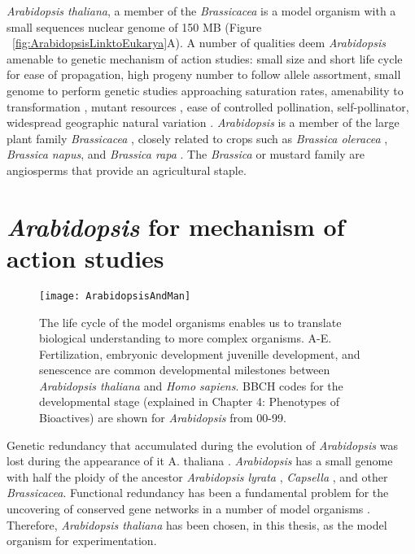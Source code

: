 {\it Arabidopsis thaliana}, a member of the {\it Brassicacea} is a model organism with a small sequences nuclear genome of 150 MB (Figure ~\ref{fig:ArabidopsisLinktoEukarya}A)\cite{mccourt2010arabidopsis,town2011comparative}.  A number of qualities deem {\it Arabidopsis} amenable to genetic mechanism of action studies: small size and short life cycle for ease of propagation, high progeny number to follow allele assortment, small genome to perform genetic studies approaching saturation rates, amenability to transformation \cite{FloralDip2008}, mutant resources \cite{knee2011germplasm}, ease of controlled pollination, self-pollinator, widespread geographic natural variation \cite{koornneef2011natural}. {\it Arabidopsis} is a member of the large plant family {\it Brassicacea} \cite{lysak2011phylogeny}, closely related to crops such as {\it Brassica oleracea} \cite{quiros2011genetics}, {\it Brassica napus}, and {\it Brassica rapa} \cite{ramchiary2011genetics}. The {\it Brassica} or mustard family are angiosperms that provide an agricultural staple.


\section{{\it Arabidopsis} for mechanism of action studies}

\begin{figure}
\texttt{[image: ArabidopsisAndMan]}
\caption{The life cycle of the model organisms enables us to translate biological understanding to more complex organisms. A-E. Fertilization, embryonic development juvenille development, and senescence are common developmental milestones between {\it Arabidopsis thaliana} and {\it Homo sapiens}. BBCH codes for the developmental stage (explained in Chapter 4: Phenotypes of Bioactives) are shown for {\it Arabidopsis} from 00-99.}
\label{fig:ArabidopsisAndMan}
\end{figure}

Genetic redundancy that accumulated during the evolution of {\it Arabidopsis} was lost during the appearance of {it A. thaliana} \cite{parkin2011chasing}. {\it Arabidopsis} has a small genome with half the ploidy of the ancestor {\it Arabidopsis lyrata} \cite{savolainen2011arabidopsis}, {\it Capsella} \cite{theissen2011genetics}, and other {\it Brassicacea}. Functional redundancy \cite{pickett1995seeing} has been a fundamental problem \cite{bouche2001arabidopsis} for the uncovering of conserved gene networks in a number of model organisms \cite{cutler2005dude}. Therefore, {\it Arabidopsis thaliana} has been chosen, in this thesis, as the model organism for experimentation. 

